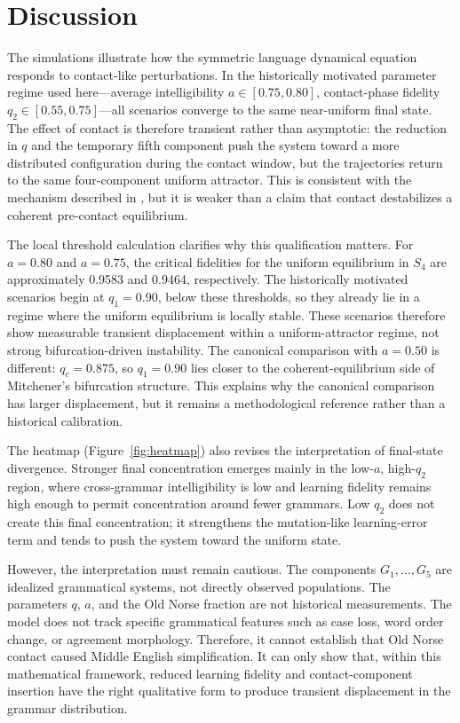 \documentclass[11pt]{article}
\begin{document}
\section{Discussion}

The simulations illustrate how the symmetric language dynamical equation responds to contact-like perturbations. In the historically motivated parameter regime used here---average intelligibility $a \in [0.75, 0.80]$, contact-phase fidelity $q_2 \in [0.55, 0.75]$---all scenarios converge to the same near-uniform final state. The effect of contact is therefore transient rather than asymptotic: the reduction in $q$ and the temporary fifth component push the system toward a more distributed configuration during the contact window, but the trajectories return to the same four-component uniform attractor. This is consistent with the mechanism described in \citet{mitchener2003bifurcation}, but it is weaker than a claim that contact destabilizes a coherent pre-contact equilibrium.

The local threshold calculation clarifies why this qualification matters. For $a=0.80$ and $a=0.75$, the critical fidelities for the uniform equilibrium in $S_4$ are approximately 0.9583 and 0.9464, respectively. The historically motivated scenarios begin at $q_1=0.90$, below these thresholds, so they already lie in a regime where the uniform equilibrium is locally stable. These scenarios therefore show measurable transient displacement within a uniform-attractor regime, not strong bifurcation-driven instability. The canonical comparison with $a=0.50$ is different: $q_c=0.875$, so $q_1=0.90$ lies closer to the coherent-equilibrium side of Mitchener's bifurcation structure. This explains why the canonical comparison has larger displacement, but it remains a methodological reference rather than a historical calibration.

The heatmap (Figure~\ref{fig:heatmap}) also revises the interpretation of final-state divergence. Stronger final concentration emerges mainly in the low-$a$, high-$q_2$ region, where cross-grammar intelligibility is low and learning fidelity remains high enough to permit concentration around fewer grammars. Low $q_2$ does not create this final concentration; it strengthens the mutation-like learning-error term and tends to push the system toward the uniform state.

However, the interpretation must remain cautious. The components $G_1,\ldots,G_5$ are idealized grammatical systems, not directly observed populations. The parameters $q$, $a$, and the Old Norse fraction are not historical measurements. The model does not track specific grammatical features such as case loss, word order change, or agreement morphology. Therefore, it cannot establish that Old Norse contact caused Middle English simplification. It can only show that, within this mathematical framework, reduced learning fidelity and contact-component insertion have the right qualitative form to produce transient displacement in the grammar distribution.
\end{document}
